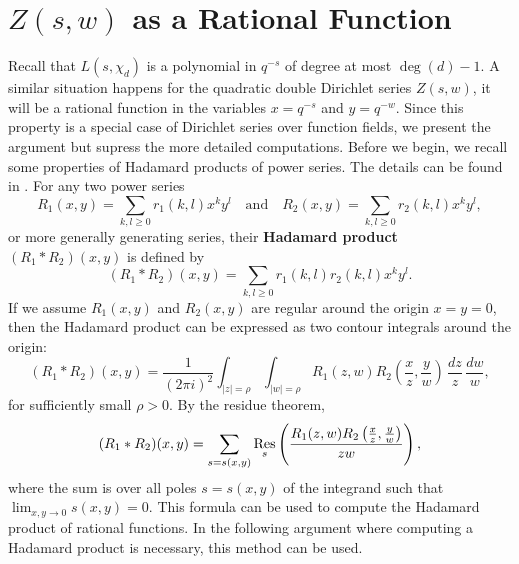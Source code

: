 \documentclass[12pt,reqno,oneside]{amsart}
\begin{document}
\section*{\texorpdfstring{$Z(s,w)$}{Z(s,w)} as a Rational Function}
    Recall that $L(s,\chi_{d})$ is a polynomial in $q^{-s}$ of degree at most $\deg(d)-1$. A similar situation happens for the quadratic double Dirichlet series $Z(s,w)$, it will be a rational function in the variables $x = q^{-s}$ and $y = q^{-w}$. Since this property is a special case of Dirichlet series over function fields, we present the argument but supress the more detailed computations. Before we begin, we recall some properties of Hadamard products of power series. The details can be found in \cite{stanley2023enumerative}. For any two power series
    \[
        R_{1}(x,y) = \sum_{k,l \ge 0}r_{1}(k,l)x^{k}y^{l} \quad \text{and} \quad R_{2}(x,y) = \sum_{k,l \ge 0}r_{2}(k,l)x^{k}y^{l},
    \]
    or more generally generating series, their \textbf{Hadamard product} $(R_{1} \ast R_{2})(x,y)$ is defined by
    \[
        (R_{1} \ast R_{2})(x,y) = \sum_{k,l \ge 0}r_{1}(k,l)r_{2}(k,l)x^{k}y^{l}.
    \]
    If we assume $R_{1}(x,y)$ and $R_{2}(x,y)$ are regular around the origin $x = y = 0$, then the Hadamard product can be expressed as two contour integrals around the origin:
    \[
        (R_{1} \ast R_{2})(x,y) = \frac{1}{(2\pi i)^{2}}\int_{|z| = \rho}\int_{|w| = \rho}R_{1}(z,w)R_{2}\left(\frac{x}{z},\frac{y}{w}\right)\,\frac{dz}{z}\,\frac{dw}{w},
    \]
    for sufficiently small $\rho > 0$. By the residue theorem,
    \[
        (R_{1} \ast R_{2})(x,y) = \sum_{s = s(x,y)}\operatorname*{\mathrm{Res}}_{s}\left(\frac{R_{1}(z,w)R_{2}\left(\frac{x}{z},\frac{y}{w}\right)}{zw}\right),
    \]
    where the sum is over all poles $s = s(x,y)$ of the integrand such that $\lim_{x,y \to 0}s(x,y) = 0$. This formula can be used to compute the Hadamard product of rational functions. In the following argument where computing a Hadamard product is necessary, this method can be used.
\end{document}
